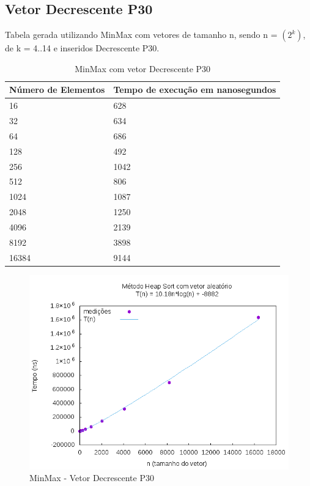\documentclass[12pt,a4paper,twoside]{report}
\begin{document}
\subsection{Vetor Decrescente P30}
Tabela gerada utilizando MinMax com vetores de tamanho n, sendo n = $(2^k)$, de k = 4..14 e inseridos Decrescente P30.
\begin{table}[H]
\centering
\caption{MinMax com vetor Decrescente P30}
\label{my-label}
\begin{tabular}{|l|l|}
\hline
\multicolumn{1}{|c|}{\textbf{Número de Elementos}} & \multicolumn{1}{c|}{\textbf{Tempo de execução em nanosegundos}} \\ \hline
16 & 628 \\ \hline
32 & 634 \\ \hline
64 & 686 \\ \hline
128 & 492 \\ \hline
256 & 1042 \\ \hline
512 & 806 \\ \hline
1024 & 1087 \\ \hline
2048 & 1250 \\ \hline
4096 & 2139 \\ \hline
8192 & 3898 \\ \hline
16384 & 9144 \\ \hline
\end{tabular}
\end{table}

\begin{figure}[H]
    \centering
    \includegraphics[width=0.7\linewidth]{graficos/HeapSort/vIntAleatorio/vIntAleatorio.png}
  \caption{MinMax - Vetor Decrescente P30}
\end{figure}
\end{document}
